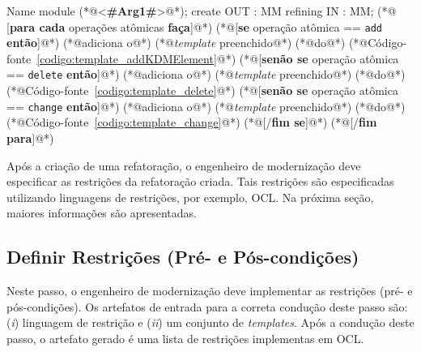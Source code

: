 \begin{codigo}[caption={[\textit{Template} ATL para agrupar as operações atômicas.] \textit{Template} ATL para agrupar as operações atômicas.},escapeinside={(*@}{@*)}, basicstyle=\footnotesize, label={codigo:template_module_agrupar}, language=ATL]{Name}
module (*@<\textbf{\#Arg1\#}>@*);
create OUT : MM refining IN : MM;
(*@ 
[\textbf{para cada} operações atômicas \textbf{faça}]@*)
    (*@[\textbf{se} operação atômica == \texttt{add} \textbf{então}]@*)
        (*@adiciona o@*) (*@\textit{template} preenchido@*) (*@do@*) (*@Código-fonte~\ref{codigo:template_addKDMElement}@*)
    (*@[\textbf{senão se} operação atômica == \texttt{delete} \textbf{então}]@*)
        (*@adiciona o@*) (*@\textit{template} preenchido@*) (*@do@*) (*@Código-fonte~\ref{codigo:template_delete}@*)
    (*@[\textbf{senão se} operação atômica == \texttt{change} \textbf{então}]@*)
        (*@adiciona o@*) (*@\textit{template} preenchido@*) (*@do@*) (*@Código-fonte~\ref{codigo:template_change}@*)
    (*@[/\textbf{fim se}]@*)
(*@[/\textbf{fim para}]@*)

\end{codigo}

Após a criação de uma refatoração, o engenheiro de modernização deve especificar as restrições da refatoração criada. Tais restrições são especificadas utilizando linguagens de restrições, por exemplo, OCL. Na próxima seção, maiores informações são apresentadas.

\subsection{Definir Restrições (Pré- e Pós-condições)}\label{sec:linguagem_de_restricao}

Neste passo, o engenheiro de modernização deve implementar as restrições (pré- e pós-condições). Os artefatos de entrada para a correta condução deste passo são: (\textit{i}) linguagem de restrição e (\textit{ii}) um conjunto de \textit{templates}. Após a condução deste passo, o artefato gerado é uma lista de restrições implementas em OCL. 

